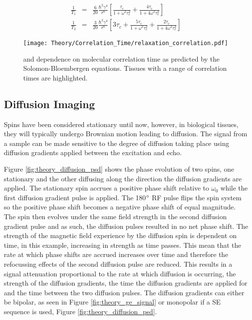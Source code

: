 \begin{eqnarray}
	\frac{1}{T_1}&=& \frac{6}{20}\frac{\hbar^2\gamma^4}{r^6}\left[ \frac{\tau_c}{1 + \omega^2\tau_c^2} + \frac{4\tau_c}{1 + 4\omega^2\tau_c^2}\right]
	\label{eq:theory_SB_t1}\\
	\frac{1}{T_2}&=& \frac{3}{20}\frac{\hbar^2\gamma^4}{r^6}\left[ 3\tau_c +  \frac{5\tau_c}{1 + \omega^2\tau_c^2} + \frac{2\tau_c}{1 + 4\omega^2\tau_c^2}\right]
	\label{eq:theory_SB_t2}
\end{eqnarray}
\begin{figure}[H]
	\centering
	\texttt{[image: Theory/Correlation\_Time/relaxation\_correlation.pdf]}
	\caption{\tone and \ttwo dependence on molecular correlation time as predicted by the Solomon-Bloembergen equations. Tissues with a range of correlation times are highlighted.}
	\label{fig:theory_relaxation_correlation}	
\end{figure}


\subsection{Diffusion Imaging}
\label{subsec:theory_diffusion}
Spins have been considered stationary until now, however, in biological tissues, they will typically undergo Brownian motion leading to diffusion. The signal from a sample can be made sensitive to the degree of diffusion taking place using diffusion gradients applied between the excitation and echo. 

Figure \ref{fig:theory_diffusion_psd} shows the phase evolution of two spins, one stationary and the other diffusing along the direction the diffusion gradients are applied. The stationary spin accrues a positive phase shift relative to $\omega_0$ while the first diffusion gradient pulse is applied. The 180$\degree$ \ac{RF} pulse flips the spin system so the positive phase shift becomes a negative phase shift of equal magnitude. The spin then evolves under the same field strength in the second diffusion gradient pulse and as such, the diffusion pulses resulted in no net phase shift. The strength of the magnetic field experience by the diffusion spin is dependent on time, in this example, increasing in strength as time passes. This mean that the rate at which phase shifts are accrued increases over time and therefore the refocussing effects of the second diffusion pulse are reduced. This results in a signal attenuation proportional to the rate at which diffusion is occurring, the strength of the diffusion gradients, the time the diffusion gradients are applied for and the time between the two diffusion pulses. The diffusion gradients can either be bipolar, as seen in Figure \ref{fig:theory_ge_signal} or monopolar if a \ac{SE} sequence is used, Figure \ref{fig:theory_diffusion_psd}.


